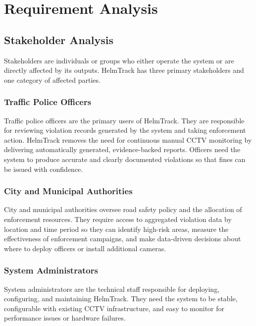 \chapter{Requirement Analysis}
\label{chap:requirement-analysis}

\section{Stakeholder Analysis}
\label{section:stakeholder-analysis}

Stakeholders are individuals or groups who either operate the system or are directly affected by its outputs. HelmTrack has three primary stakeholders and one category of affected parties.

\subsection{Traffic Police Officers}
\begin{subsecbody}
Traffic police officers are the primary users of HelmTrack. They are responsible for reviewing violation records generated by the system and taking enforcement action. HelmTrack removes the need for continuous manual CCTV monitoring by delivering automatically generated, evidence-backed reports. Officers need the system to produce accurate and clearly documented violations so that fines can be issued with confidence.
\end{subsecbody}

\subsection{City and Municipal Authorities}
\begin{subsecbody}
City and municipal authorities oversee road safety policy and the allocation of enforcement resources. They require access to aggregated violation data by location and time period so they can identify high-risk areas, measure the effectiveness of enforcement campaigns, and make data-driven decisions about where to deploy officers or install additional cameras.
\end{subsecbody}

\subsection{System Administrators}
\begin{subsecbody}
System administrators are the technical staff responsible for deploying, configuring, and maintaining HelmTrack. They need the system to be stable, configurable with existing CCTV infrastructure, and easy to monitor for performance issues or hardware failures.
\end{subsecbody}

